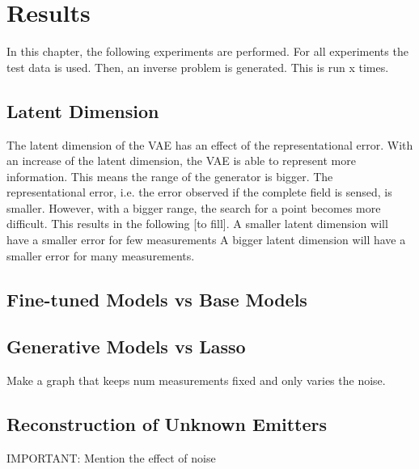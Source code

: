 
\chapter{Results}\label{chapter:results}
In this chapter, the following experiments are performed.
For all experiments the test data is used.
Then, an inverse problem is generated.
This is run x times.

\section{Latent Dimension}
The latent dimension of the VAE has an effect of the representational error.
With an increase of the latent dimension, the VAE is able to represent more information.
This means the range of the generator is bigger.
The representational error, i.e. the error observed if the complete field is sensed, is smaller.
However, with a bigger range, the search for a point becomes more difficult.
This results in the following [to fill].
A smaller latent dimension will have a smaller error for few measurements
A bigger latent dimension will have a smaller error for many measurements.

\section{Fine-tuned Models vs Base Models}
\section{Generative Models vs Lasso}
Make a graph that keeps num measurements fixed and only varies the noise.

\section{Reconstruction of Unknown Emitters}

IMPORTANT:
Mention the effect of noise